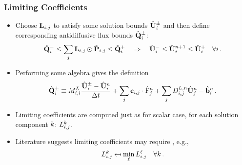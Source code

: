 \begin{frame}
\frametitle{Limiting Coefficients}

\begin{itemize}
  \item Choose $\mathbf{L}_{i,j}$ to satisfy some solution bounds
    $\hat{\mathbf{U}}_{i}^\pm$ and then define corresponding
    antidiffusive flux bounds $\hat{\mathbf{Q}}_i^\pm$:
    \begin{equation}
      \hat{\mathbf{\limitedfluxbound}}^-_i \leq
        \sum\limits_j \limitermatrix\ij\odot\hat{\correctionfluxmatrix}\ij \leq
        \hat{\mathbf{\limitedfluxbound}}^+_i
      \quad\Rightarrow\quad
      \hat{\solutionvector}_i^- \leq
        \hat{\solutionvector}_i^{n+1} \leq
        \hat{\solutionvector}_i^+ \quad \forall i \eqp
    \end{equation}
  \item Performing some algebra gives the definition
    \begin{equation}
      \hat{\mathbf{\limitedfluxbound}}_i^\pm \equiv
        \lumpedmassentry\frac{\hat{\solutionvector}_i^\pm
          -\hat{\solutionvector}_i^n}{\dt}
        + \sum_j\gradiententry\cdot\hat{\consfluxinterpolant}_j^n
        + \sum_j\diffusionmatrixletter\ij^{L,n}\hat{\solutionvector}_j^n
        - \hat{\ssrhs}_i^n \eqp
    \end{equation}
  \item Limiting coefficients are computed just as for scalar case, for
    each solution component $k$:
    $L_{i,j}^{k}$.
  \item Literature suggests limiting coefficients may require
    , e.g.,
    \begin{equation}
      L_{i,j}^k \mapsfrom
        \min\limits_\ell L_{i,j}^\ell \quad \forall k \,.
    \end{equation}
\end{itemize}

\end{frame}

